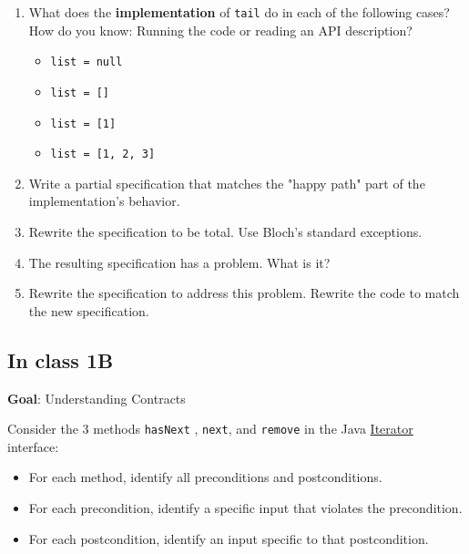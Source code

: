 \documentclass[11pt]{article}
\begin{document}
\begin{enumerate}
\item What does the \textbf{implementation} of \texttt{tail} do in each of the following cases? How do you know: Running the code or reading an API description?
\begin{itemize}
\item \texttt{list = null}
\item \texttt{list = []}
\item \texttt{list = [1]}
\item \texttt{list = [1, 2, 3]}
\end{itemize}
\item Write a partial specification that matches the "happy path" part of the implementation's behavior.
\item Rewrite the specification to be total. Use Bloch's standard exceptions.
\item The resulting specification has a problem. What is it?
\item Rewrite the specification to address this problem. Rewrite the code to match the new specification.
\end{enumerate}

\subsection{In class 1B}
\label{sec:org88b0623}
\textbf{Goal}: Understanding Contracts 

Consider the 3 methods \texttt{hasNext} , \texttt{next}, and \texttt{remove} in the Java \href{https://docs.oracle.com/javase/7/docs/api/java/util/Iterator.html}{Iterator} interface:

\begin{itemize}
\item For each method, identify all preconditions and postconditions.
\item For each precondition, identify a specific input that violates the precondition.
\item For each postcondition, identify an input specific to that postcondition.
\end{itemize}
\end{document}
